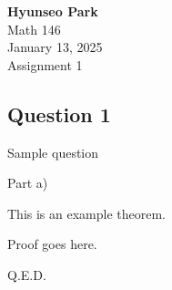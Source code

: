 \documentclass[10pt]{article}
\begin{document}
\begin{center}
    \textbf{Hyunseo Park} \\
    Math 146 \\
    January 13, 2025 \\
    Assignment 1
\end{center}


\begin{center} 
    \section*{Question 1}
\end{center}

\blueline

\vspace{0.3cm}

\begin{enumerate}[{$[$}1{$]$}]
    \item Sample question
    \begin{enumerate}[{$[$}a{$]$}]
        \item Part a)
    \end{enumerate}
\end{enumerate}

\blueline

\vspace{0.3cm}

\begin{center}
    \begin{theorem}
        This is an example theorem.
    \end{theorem}
\end{center}

\vspace{0.3cm}

\begin{proofb}
Proof goes here.
\end{proofb}

\vspace{0.3cm}
\begin{center}
    Q.E.D.
\end{center}

\blueline
\end{document}
